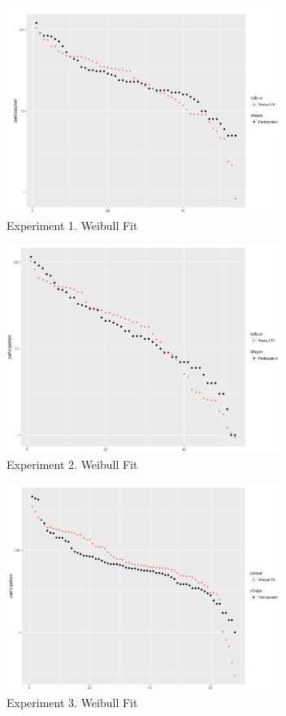 \begin{figure}[!t]
    \centering
        \includegraphics[width=3.5in]{img/weibull_1.png}
    \caption{Experiment 1. Weibull Fit}
    \label{fig:w1}
\end{figure}
\begin{figure}[!t]
    \centering
        \includegraphics[width=3.5in]{img/weibull_2.png}
    \caption{Experiment 2. Weibull Fit}
    \label{fig:w2}
\end{figure}
\begin{figure}[!t]
    \centering
        \includegraphics[width=3.5in]{img/weibull_3.png}
    \caption{Experiment 3. Weibull Fit}
    \label{fig:w3}
\end{figure}




